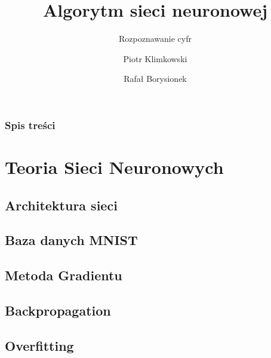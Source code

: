 \documentclass{beamer}
\title[Sieć neuronowa- rozpoznawanie cyfr]
{Algorytm sieci neuronowej}
\subtitle{Rozpoznawanie cyfr}
\author[Piotr Klimkowski  \and Rafał Borysionek]
{Piotr Klimkowski \and Rafał Borysionek}
\institute[]
{Wydział Elektroniki \\
Politechnika Wrocławska
}
\begin{document}
\begin{frame}
  \titlepage
\end{frame}


\begin{frame}
  \frametitle{Spis treści}
  \tableofcontents
\end{frame}

\section{Teoria Sieci Neuronowych}

\subsection{Architektura sieci}
\subsection{Baza danych MNIST}
\subsection{Metoda Gradientu}
\subsection{Backpropagation}
\subsection{Overfitting}


\end{document}
